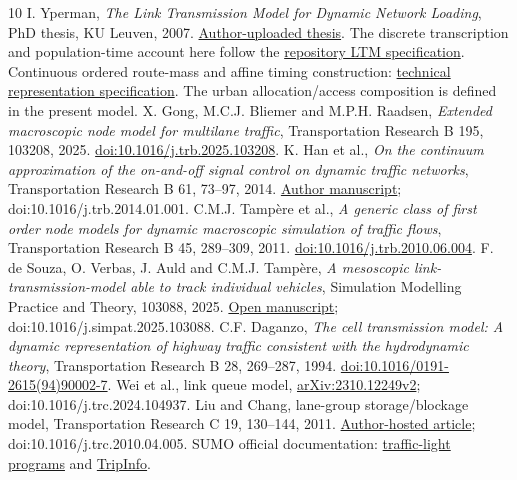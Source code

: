 \documentclass[10pt,a4paper]{article}
\newcommand{\head}[1]{\par\vspace{4pt}\noindent\textbf{#1}\par\nobreak\vspace{1pt}}
\begin{document}
\makeatletter
\renewcommand{\section}{\@ifstar{\head}{\head}}
\makeatother
\begin{thebibliography}{10}
\setlength{\itemsep}{0pt}\setlength{\parskip}{0pt}
{I. Yperman, \emph{The Link Transmission Model for Dynamic
Network Loading}, PhD thesis, KU Leuven, 2007.
\href{https://www.researchgate.net/publication/28360292_The_Link_Transmission_Model_for_dynamic_network_loading}{Author-uploaded thesis}.
The discrete transcription and population-time account here follow the
\href{../../../../docs/milestones/milestone_0_ltm_baseline.md}{repository LTM specification}.}
{Continuous ordered route-mass and affine timing construction:
\href{../../../../docs/milestones/milestone_1_ordered_route_mass_ledger.md}
{technical representation specification}. The urban allocation/access
composition is defined in the present model.}
{X. Gong, M.C.J. Bliemer and M.P.H. Raadsen,
\emph{Extended macroscopic node model for multilane traffic},
Transportation Research B 195, 103208, 2025.
\href{https://doi.org/10.1016/j.trb.2025.103208}{doi:10.1016/j.trb.2025.103208}.}
{K. Han et al., \emph{On the continuum approximation of the
on-and-off signal control on dynamic traffic networks}, Transportation
Research B 61, 73--97, 2014.
\href{https://arxiv.org/abs/1309.3461}{Author manuscript};
doi:10.1016/j.trb.2014.01.001.}
{C.M.J. Tamp\`ere et al., \emph{A generic class of first order
node models for dynamic macroscopic simulation of traffic flows},
Transportation Research B 45, 289--309, 2011.
\href{https://doi.org/10.1016/j.trb.2010.06.004}{doi:10.1016/j.trb.2010.06.004}.}
{F. de Souza, O. Verbas, J. Auld and C.M.J. Tamp\`ere,
\emph{A mesoscopic link-transmission-model able to track individual vehicles},
Simulation Modelling Practice and Theory, 103088, 2025.
\href{https://www.osti.gov/servlets/purl/2569501}{Open manuscript};
doi:10.1016/j.simpat.2025.103088.}
{C.F. Daganzo, \emph{The cell transmission model: A dynamic
representation of highway traffic consistent with the hydrodynamic theory},
Transportation Research B 28, 269--287, 1994.
\href{https://doi.org/10.1016/0191-2615(94)90002-7}{doi:10.1016/0191-2615(94)90002-7}.}
{Wei et al., link queue model,
\href{https://arxiv.org/html/2310.12249v2}{arXiv:2310.12249v2};
doi:10.1016/j.trc.2024.104937.}
{Liu and Chang, lane-group storage/blockage model,
Transportation Research C 19, 130--144, 2011.
\href{https://attap.umd.edu/wp-content/uploads/2022/05/TRC522.pdf}{Author-hosted article};
doi:10.1016/j.trc.2010.04.005.}
{SUMO official documentation:
\href{https://sumo.dlr.de/docs/Simulation/Traffic_Lights.html}{traffic-light programs}
and \href{https://sumo.dlr.de/docs/Simulation/Output/TripInfo.html}{TripInfo}.}
\end{thebibliography}
\end{document}
